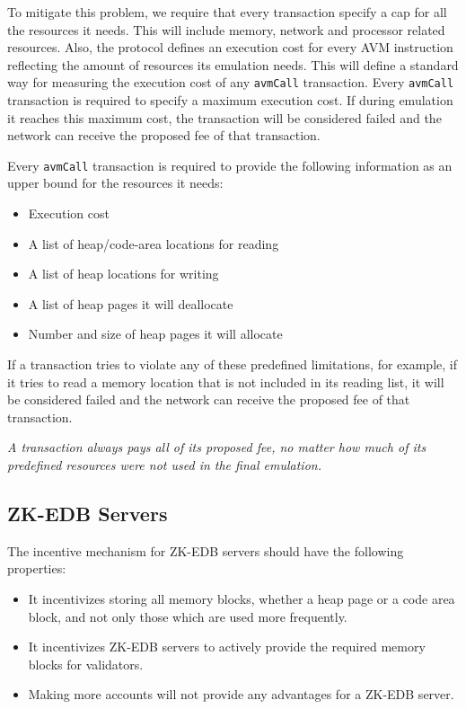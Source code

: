 \documentclass[11pt, A4]{report}
\begin{document}
    To mitigate this problem, we require that every transaction specify a cap for all the resources it needs. This
    will include memory, network and processor related resources. Also, the protocol defines an execution cost for
    every AVM instruction reflecting the amount of resources its emulation needs. This will define a standard way for
    measuring the execution cost of any \texttt{avmCall} transaction. Every \texttt{avmCall} transaction is required
    to specify a maximum execution cost. If during emulation it reaches this maximum cost, the transaction will be
    considered failed and the network can receive the proposed fee of that transaction.

    Every \texttt{avmCall} transaction is required to provide the following information as an upper bound for the
    resources it needs:

    \begin{itemize}
        \item Execution cost
        \item A list of heap/code-area locations for reading
        \item A list of heap locations for writing
        \item A list of heap pages it will deallocate
        \item Number and size of heap pages it will allocate
    \end{itemize}

    If a transaction tries to violate any of these predefined limitations, for example, if it tries to read a memory
    location that is not included in its reading list, it will be considered failed and the network can receive the
    proposed fee of that transaction.

    \emph{A transaction always pays all of its proposed fee, no matter how much of its predefined resources were not
    used in the final emulation.}

    \subsection{ZK-EDB Servers}\label{subsec:zk-edb-servers}

    The incentive mechanism for ZK-EDB servers should have the following properties:

    \begin{itemize}
        \item It incentivizes storing all memory blocks, whether a heap page or a code area block, and not only those
        which are used more frequently.
        \item It incentivizes ZK-EDB servers to actively provide the required memory blocks for validators.
        \item Making more accounts will not provide any advantages for a ZK-EDB server.
    \end{itemize}
\end{document}
